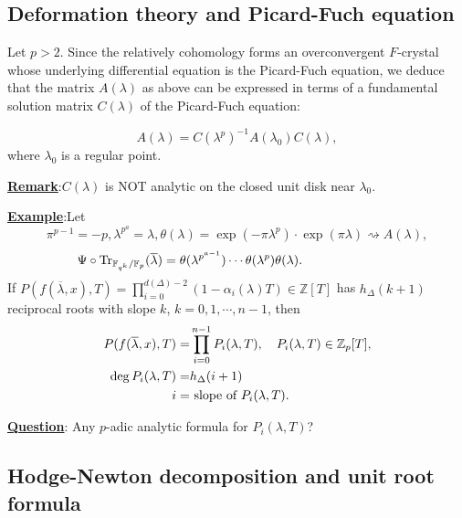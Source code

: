 \documentclass[a4paper,oneside,11pt]{article}
\theoremstyle{plain} \theoremstyle{definition}
\theoremstyle{remark}
\newcommand{\Z}{\mathbb{Z}}
\newcommand{\f}{\mathbb{F}}
\begin{document}
\subsection{Deformation theory and Picard-Fuch equation}

Let $p>2$. Since the relatively cohomology forms an overconvergent $F$-crystal 
whose underlying differential equation is the Picard-Fuch equation, we deduce that 
the matrix $A(\lambda)$ as above can be expressed in terms of a fundamental solution
matrix $C(\lambda)$ of the Picard-Fuch equation:

$$A(\lambda)=C(\lambda^p)^{-1}A(\lambda_0)C(\lambda),$$
where $\lambda_0$ is a regular point.


\underline{\bf Remark}:\quad $C(\lambda)$ is NOT analytic on the
closed unit disk near $\lambda_0$.


\underline{\bf Example}:\quad Let $$\pi^{p-1}=-p,
\lambda^{p^a}=\lambda, \theta(\lambda)=\exp(-\pi
\lambda^p)\cdot\exp(\pi\lambda) \rightsquigarrow A(\lambda),$$
$$\Psi\circ
\text{Tr}_{\f_{q^k}/{\f_p}}(\overline{\lambda})=\theta(\lambda^{p^{a-1}})
\cdots\theta(\lambda^p)\theta(\lambda).\hskip 2.6cm$$ If
$P(f(\overline{\lambda},x),T)=\prod_{i=0}^{d(\Delta)-2}(1-\alpha_i(\lambda) T)\in \Z[T]$ has
$h_\Delta(k+1)$ reciprocal roots with slope $k$, $k=0,1,\cdots, n-1$,
then $$\aligned P(f(\overline{\lambda},x),T)=&\prod_{i=0}^{n-1}P_i(\lambda, T),\quad P_i(\lambda, T)\in \Z_p[T],\\
\deg P_i(\lambda, T)=&h_\Delta(i+1)\\ i=&\text{ slope of } P_i(\lambda, T).\endaligned$$

\underline{\bf Question}: Any $p$-adic analytic formula for $P_i(\lambda, T)$?

\subsection{Hodge-Newton decomposition and unit root formula}
\end{document}
